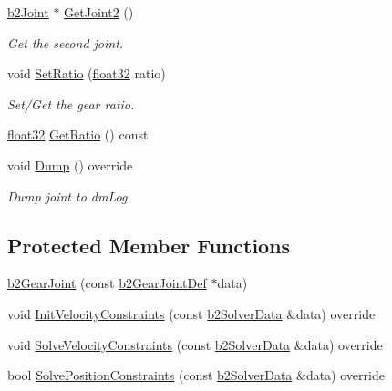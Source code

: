 \begin{DoxyCompactItemize}
\mbox{\hyperlink{classb2_joint}{b2\+Joint}} $\ast$ \mbox{\hyperlink{classb2_gear_joint_af1673b8edd80f3ae3b868c3a18b7b058}{Get\+Joint2}} ()
\begin{DoxyCompactList}\small\item\em Get the second joint. \end{DoxyCompactList}\item 
void \mbox{\hyperlink{classb2_gear_joint_a21c867bdc00c15ade2f399d370f92636}{Set\+Ratio}} (\mbox{\hyperlink{b2_settings_8h_aacdc525d6f7bddb3ae95d5c311bd06a1}{float32}} ratio)
\begin{DoxyCompactList}\small\item\em Set/\+Get the gear ratio. \end{DoxyCompactList}\item 
\mbox{\hyperlink{b2_settings_8h_aacdc525d6f7bddb3ae95d5c311bd06a1}{float32}} \mbox{\hyperlink{classb2_gear_joint_a46dffdce62bdf15a28c10a27d640bc10}{Get\+Ratio}} () const
\item 
void \mbox{\hyperlink{classb2_gear_joint_a40ca34a7853db14d3978c0b18598dd8d}{Dump}} () override
\begin{DoxyCompactList}\small\item\em Dump joint to dm\+Log. \end{DoxyCompactList}\end{DoxyCompactItemize}
\subsection*{Protected Member Functions}
\begin{DoxyCompactItemize}
\item 
\mbox{\hyperlink{classb2_gear_joint_a4b247c79e74cb1e5b906527fe7d151ce}{b2\+Gear\+Joint}} (const \mbox{\hyperlink{structb2_gear_joint_def}{b2\+Gear\+Joint\+Def}} $\ast$data)
\item 
void \mbox{\hyperlink{classb2_gear_joint_ac3c76db6940bcb4c94d564960b9c57ab}{Init\+Velocity\+Constraints}} (const \mbox{\hyperlink{structb2_solver_data}{b2\+Solver\+Data}} \&data) override
\item 
void \mbox{\hyperlink{classb2_gear_joint_a25ff465354108f5ae2b60fb9f7836820}{Solve\+Velocity\+Constraints}} (const \mbox{\hyperlink{structb2_solver_data}{b2\+Solver\+Data}} \&data) override
\item 
bool \mbox{\hyperlink{classb2_gear_joint_a85633bbab3c4b4cb862bccce7e0253c2}{Solve\+Position\+Constraints}} (const \mbox{\hyperlink{structb2_solver_data}{b2\+Solver\+Data}} \&data) override
\end{DoxyCompactItemize}
